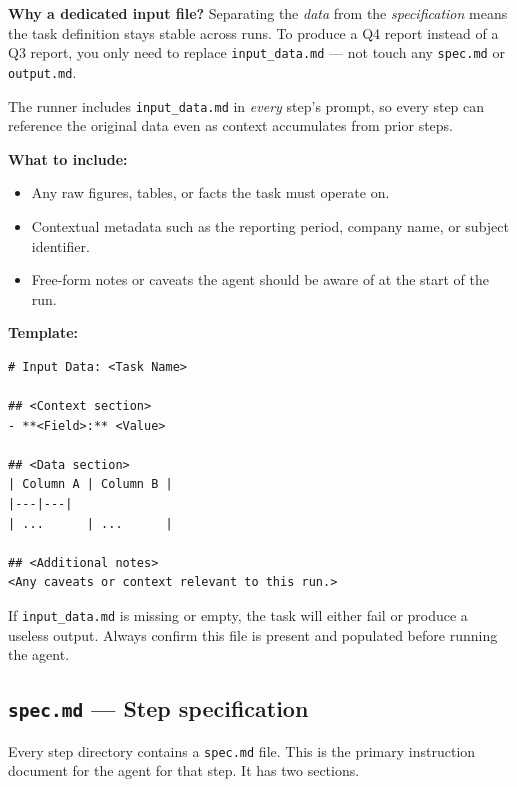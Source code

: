 \documentclass[12pt, a4paper]{article}
\begin{document}
\begin{notebox}
\textbf{Why a dedicated input file?} Separating the \textit{data} from the \textit{specification} means the task definition stays stable across runs. To produce a Q4 report instead of a Q3 report, you only need to replace \texttt{input\_data.md} --- not touch any \texttt{spec.md} or \texttt{output.md}.
\end{notebox}

The runner includes \texttt{input\_data.md} in \textit{every} step's prompt, so every step can reference the original data even as context accumulates from prior steps.

\textbf{What to include:}

\begin{itemize}[leftmargin=1.5em]
  \item Any raw figures, tables, or facts the task must operate on.
  \item Contextual metadata such as the reporting period, company name, or subject identifier.
  \item Free-form notes or caveats the agent should be aware of at the start of the run.
\end{itemize}

\textbf{Template:}

\begin{lstlisting}[language={}]
# Input Data: <Task Name>

## <Context section>
- **<Field>:** <Value>

## <Data section>
| Column A | Column B |
|---|---|
| ...      | ...      |

## <Additional notes>
<Any caveats or context relevant to this run.>
\end{lstlisting}

\begin{warnbox}
If \texttt{input\_data.md} is missing or empty, the task will either fail or produce a useless output. Always confirm this file is present and populated before running the agent.
\end{warnbox}

\subsection{\texttt{spec.md} --- Step specification}

Every step directory contains a \texttt{spec.md} file. This is the primary instruction document for the agent for that step. It has two sections.
\end{document}
